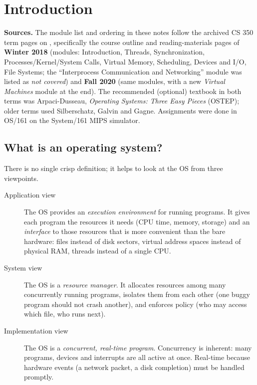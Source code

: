 \chapter{Introduction}

\begin{aside}
\textbf{Sources.} The module list and ordering in these notes follow the archived CS 350 term
pages on , specifically the course outline and
reading-materials pages of \textbf{Winter 2018} (modules: Introduction, Threads, Synchronization,
Processes/Kernel/System Calls, Virtual Memory, Scheduling, Devices and I/O, File Systems; the
``Interprocess Communication and Networking'' module was listed as \emph{not covered}) and
\textbf{Fall 2020} (same modules, with a new \emph{Virtual Machines} module at the end). The
recommended (optional) textbook in both terms was Arpaci-Dusseau, \emph{Operating Systems: Three
Easy Pieces} (OSTEP); older terms used Silberschatz, Galvin and Gagne. Assignments were done in
OS/161 on the System/161 MIPS simulator.
\end{aside}

\section{What is an operating system?}

There is no single crisp definition; it helps to look at the OS from three viewpoints.

\begin{description}
  \item[Application view] The OS provides an \emph{execution environment} for running
    programs. It gives each program the resources it needs (CPU time, memory, storage) and an
    \emph{interface} to those resources that is more convenient than the bare hardware:
    files instead of disk sectors, virtual address spaces instead of physical RAM,
    threads instead of a single CPU.
  \item[System view] The OS is a \emph{resource manager}. It allocates resources among many
    concurrently running programs, isolates them from each other (one buggy program should
    not crash another), and enforces policy (who may access which file, who runs next).
  \item[Implementation view] The OS is a \emph{concurrent, real-time program}. Concurrency
    is inherent: many programs, devices and interrupts are all active at once. Real-time
    because hardware events (a network packet, a disk completion) must be handled promptly.
\end{description}

